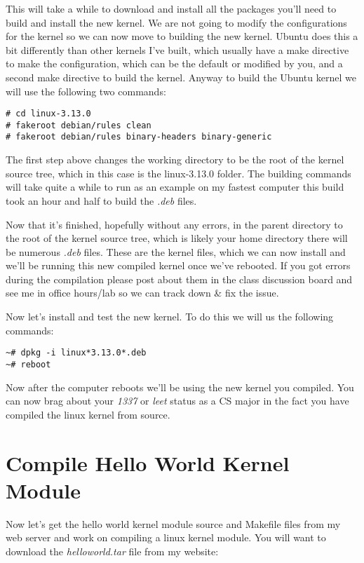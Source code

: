 \documentclass[11pt]{article}
\begin{document}
This will take a while to download and install all the packages you'll need to build and install the new kernel. We are not going to modify the configurations for the kernel so we can now move to building the new kernel. Ubuntu does this a bit differently than other kernels I've built, which usually have a make directive to make the configuration, which can be the default or modified by you, and a second make directive to build the kernel. Anyway to build the Ubuntu kernel we will use the following two commands:

\begin{verbatim}
# cd linux-3.13.0
# fakeroot debian/rules clean
# fakeroot debian/rules binary-headers binary-generic
\end{verbatim}

The first step above changes the working directory to be the root of the kernel source tree, which in this case is the linux-3.13.0 folder. The building commands will take quite a while to run as an example on my fastest computer this build took an hour and half to build the \emph{.deb} files. 

Now that it's finished, hopefully without any errors, in the parent directory to the root of the kernel source tree, which is likely your home directory there will be numerous \emph{.deb} files. These are the kernel files, which we can now install and we'll be running this new compiled kernel once we've rebooted. If you got errors during the compilation please post about them in the class discussion board and see me in office hours/lab so we can track down \& fix the issue.

Now let's install and test the new kernel. To do this we will us the following commands:

\begin{verbatim}
~# dpkg -i linux*3.13.0*.deb
~# reboot
\end{verbatim}

Now after the computer reboots we'll be using the new kernel you compiled. You can now brag about your \emph{1337} or \emph{leet} status as a CS major in the fact you have compiled the linux kernel from source. 

\section*{Compile Hello World Kernel Module}

Now let's get the hello world kernel module source and Makefile files from my web server and work on compiling a linux kernel module. You will want to download the {\it helloworld.tar} file from my website:
\end{document}
